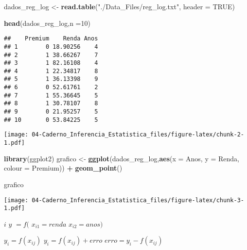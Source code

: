 \documentclass[
]{article}
\newenvironment{Shaded}{\begin{snugshade}}{\end{snugshade}}
\newcommand{\AttributeTok}[1]{\textcolor[rgb]{0.13,0.29,0.53}{#1}}
\newcommand{\ConstantTok}[1]{\textcolor[rgb]{0.56,0.35,0.01}{#1}}
\newcommand{\DecValTok}[1]{\textcolor[rgb]{0.00,0.00,0.81}{#1}}
\newcommand{\FunctionTok}[1]{\textcolor[rgb]{0.13,0.29,0.53}{\textbf{#1}}}
\newcommand{\NormalTok}[1]{#1}
\newcommand{\OtherTok}[1]{\textcolor[rgb]{0.56,0.35,0.01}{#1}}
\newcommand{\SpecialCharTok}[1]{\textcolor[rgb]{0.81,0.36,0.00}{\textbf{#1}}}
\newcommand{\StringTok}[1]{\textcolor[rgb]{0.31,0.60,0.02}{#1}}
\begin{document}
\begin{Shaded}
\begin{Highlighting}[]
\NormalTok{dados\_reg\_log }\OtherTok{\textless{}{-}} \FunctionTok{read.table}\NormalTok{(}\StringTok{"./Data\_Files/reg\_log.txt"}\NormalTok{, }\AttributeTok{header =} \ConstantTok{TRUE}\NormalTok{)}

\FunctionTok{head}\NormalTok{(dados\_reg\_log,}\AttributeTok{n =}\DecValTok{10}\NormalTok{)}
\end{Highlighting}
\end{Shaded}

\begin{verbatim}
##    Premium    Renda Anos
## 1        0 18.90256    4
## 2        1 38.66267    7
## 3        1 82.16108    4
## 4        1 22.34817    8
## 5        1 36.13398    9
## 6        0 52.61761    2
## 7        1 55.36645    5
## 8        1 30.78107    8
## 9        0 21.95257    5
## 10       0 53.84225    5
\end{verbatim}

\begin{Shaded}
\end{Shaded}

\texttt{[image: 04-Caderno\_Inferencia\_Estatistica\_files/figure-latex/chunk-2-1.pdf]}

\begin{Shaded}
\begin{Highlighting}[]
\FunctionTok{library}\NormalTok{(ggplot2)}
\NormalTok{grafico }\OtherTok{\textless{}{-}} \FunctionTok{ggplot}\NormalTok{(dados\_reg\_log,}\FunctionTok{aes}\NormalTok{(}\AttributeTok{x =}\NormalTok{ Anos, }\AttributeTok{y =}\NormalTok{ Renda, }\AttributeTok{colour =}\NormalTok{ Premium)) }\SpecialCharTok{+} \FunctionTok{geom\_point}\NormalTok{()}

\NormalTok{grafico}
\end{Highlighting}
\end{Shaded}

\texttt{[image: 04-Caderno\_Inferencia\_Estatistica\_files/figure-latex/chunk-3-1.pdf]}

\(i\) \(y\) \(=f(\) \(x_{i1} = renda\) \(x_{i2} = anos)\)

\(y_{i} = f (x_{ij})\) \(y_{i} = f(x_{ij})+erro\)
\(erro = y_{i}-f (x_{ij} )\)
\end{document}
